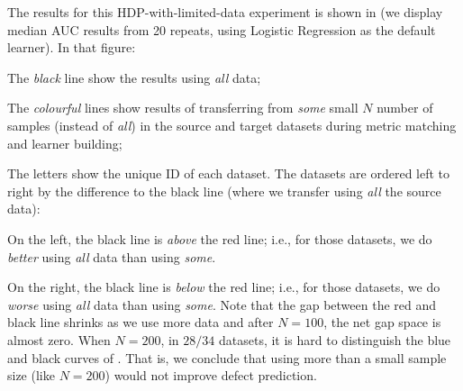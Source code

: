 The results for this HDP-with-limited-data experiment is shown in 
(we display median AUC results from 20 repeats, using  Logistic Regression
as the default learner). 
In that figure:
\squishlist
\item
  The {\em black} line show the results using {\em all} data;
\item
  The {\em colourful} lines show results of transferring from {\em some} small $N$ number of samples (instead of {\em all})
  in the source and target datasets during metric matching and learner building;
\item
  The letters show the unique ID of each dataset.
\squishend
The datasets are ordered left to right by the difference to the black line (where we transfer using {\em
  all} the source data):
\squishlist
\item
  On the left, the black line is
  {\em above} the red line; i.e., for those datasets, we do {\em better} using
  {\em all} data than using {\em some}.
  \item
On the right, the black line is {\em below} the red
line; i.e., for those datasets, we do {\em worse}
using {\em all} data than using {\em some}.
\squishend
Note that the gap between the red and black line
shrinks as we use more data and after $N=100$, the
net gap space is almost zero.  When $N=200$, in $28/34$
datasets,
it is hard to distinguish
the blue and black curves of .
That is, we conclude
that using more
than a small sample size
(like $N=200$) would
not improve defect prediction.






